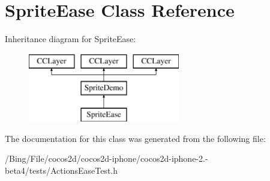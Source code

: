 \hypertarget{interface_sprite_ease}{\section{Sprite\-Ease Class Reference}
\label{interface_sprite_ease}
}
Inheritance diagram for Sprite\-Ease\-:\begin{figure}[H]
\begin{center}
\leavevmode
\includegraphics[height=3.000000cm]{interface_sprite_ease}
\end{center}
\end{figure}


The documentation for this class was generated from the following file\-:\begin{DoxyCompactItemize}
\item 
/\-Bing/\-File/cocos2d/cocos2d-\/iphone/cocos2d-\/iphone-\/2.-\/beta4/tests/Actions\-Ease\-Test.\-h\end{DoxyCompactItemize}
